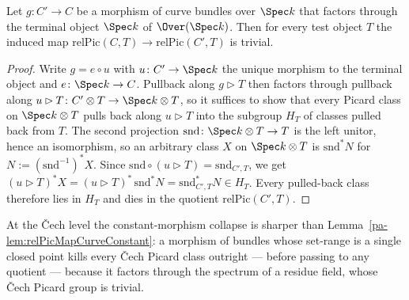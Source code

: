 \begin{lemma}
  \label{pa-lem:relPicMapCurveConstant}
  \leanok

  Let \(g \colon C' \to C\) be a morphism of curve bundles over \(\Spec k\) that factors
  through the terminal object \(\Spec k\) of \(\Over(\Spec k)\). Then for every test
  object \(T\) the induced map \(\mathrm{relPic}(C,T) \to \mathrm{relPic}(C',T)\) is
  trivial.
\end{lemma}
\begin{proof}
  \leanok
  Write \(g = e \circ u\) with \(u \colon C' \to \Spec k\) the unique morphism to the
  terminal object and \(e \colon \Spec k \to C\). Pullback along \(g \rhd T\) then factors
  through pullback along \(u \rhd T \colon C' \otimes T \to \Spec k \otimes T\), so it
  suffices to show that every Picard class on \(\Spec k \otimes T\) pulls back along
  \(u \rhd T\) into the subgroup \(H_T\) of classes pulled back from \(T\). The second
  projection \(\mathrm{snd} \colon \Spec k \otimes T \to T\) is the left unitor, hence an
  isomorphism, so an arbitrary class \(X\) on \(\Spec k \otimes T\) is
  \(\mathrm{snd}^{*} N\) for \(N := (\mathrm{snd}^{-1})^{*} X\). Since
  \(\mathrm{snd} \circ (u \rhd T) = \mathrm{snd}_{C',T}\), we get
  \((u \rhd T)^{*} X = (u \rhd T)^{*}\,\mathrm{snd}^{*} N = \mathrm{snd}_{C',T}^{*} N \in
  H_T\). Every pulled-back class therefore lies in \(H_T\) and dies in the quotient
  \(\mathrm{relPic}(C',T)\).
\end{proof}

At the \v Cech level the constant-morphism collapse is sharper than
Lemma~\ref{pa-lem:relPicMapCurveConstant}: a morphism of bundles whose set-range is a
single closed point kills every \v Cech Picard class outright --- before passing to any
quotient --- because it factors through the spectrum of a residue field, whose \v Cech
Picard group is trivial.

